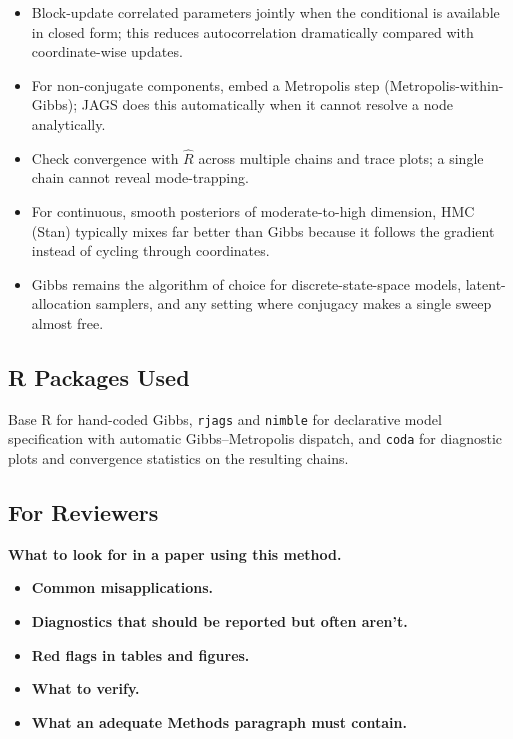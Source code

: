 \documentclass[
]{article}
\providecommand{\tightlist}{%
  \setlength{\itemsep}{0pt}\setlength{\parskip}{0pt}}
\begin{document}
\begin{itemize}
\tightlist
\item
  Block-update correlated parameters jointly when the conditional is
  available in closed form; this reduces autocorrelation dramatically
  compared with coordinate-wise updates.
\item
  For non-conjugate components, embed a Metropolis step
  (Metropolis-within-Gibbs); JAGS does this automatically when it cannot
  resolve a node analytically.
\item
  Check convergence with \(\hat R\) across multiple chains and trace
  plots; a single chain cannot reveal mode-trapping.
\item
  For continuous, smooth posteriors of moderate-to-high dimension, HMC
  (Stan) typically mixes far better than Gibbs because it follows the
  gradient instead of cycling through coordinates.
\item
  Gibbs remains the algorithm of choice for discrete-state-space models,
  latent-allocation samplers, and any setting where conjugacy makes a
  single sweep almost free.
\end{itemize}

\subsection{R Packages Used}\label{r-packages-used}

Base R for hand-coded Gibbs, \texttt{rjags} and \texttt{nimble} for
declarative model specification with automatic Gibbs--Metropolis
dispatch, and \texttt{coda} for diagnostic plots and convergence
statistics on the resulting chains.

\subsection{For Reviewers}\label{for-reviewers}

\textbf{What to look for in a paper using this method.}

\begin{itemize}
\tightlist
\item
  \textbf{Common misapplications.}
\item
  \textbf{Diagnostics that should be reported but often aren't.}
\item
  \textbf{Red flags in tables and figures.}
\item
  \textbf{What to verify.}
\item
  \textbf{What an adequate Methods paragraph must contain.}
\end{itemize}
\end{document}

